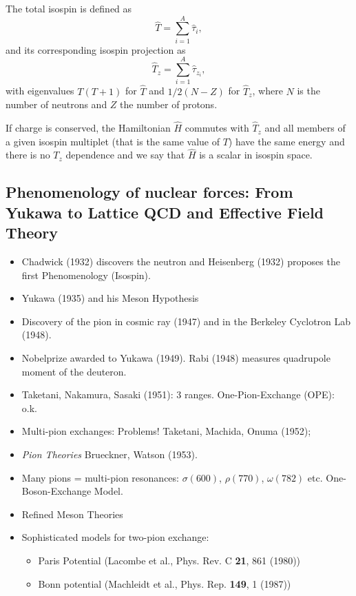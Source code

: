\documentclass[%
oneside,                 %
final,                   %
10pt]{article}
\begin{document}
The total isospin is defined as
\[
\hat{T}=\sum_{i=1}^A\hat{\tau}_i,
\]
and its corresponding isospin projection as
\[
\hat{T}_z=\sum_{i=1}^A\hat{\tau}_{z_i},
\]
with eigenvalues $T(T+1)$ for $\hat{T}$ and $1/2(N-Z)$ for $\hat{T}_z$, where $N$ is the number of neutrons and $Z$ the number of protons. 

If charge is conserved, the Hamiltonian $\hat{H}$ commutes with $\hat{T}_z$ and all members of a given isospin multiplet
(that is the same value of $T$) have the same energy and there is no $T_z$ dependence and we say that $\hat{H}$ is a scalar in isospin space.

\subsection{Phenomenology of nuclear forces: From Yukawa to Lattice QCD and Effective Field Theory}


\begin{itemize}
\item Chadwick (1932) discovers the neutron and Heisenberg (1932) proposes the first Phenomenology (Isospin).  

\item Yukawa (1935) and his Meson Hypothesis       

\item Discovery of the pion in cosmic ray (1947) and in the Berkeley Cyclotron Lab (1948).

\item Nobelprize awarded to Yukawa (1949).  Rabi (1948) measures quadrupole moment of the deuteron.

\item Taketani, Nakamura, Sasaki (1951): 3 ranges.      One-Pion-Exchange (OPE): o.k.

\item Multi-pion exchanges: Problems!   Taketani, Machida, Onuma (1952);

\item \emph{Pion Theories} Brueckner, Watson (1953).

\item Many pions = multi-pion resonances: $\sigma(600)$,  $\rho(770)$,  $\omega(782)$ etc. One-Boson-Exchange Model.

\item Refined Meson Theories

\item Sophisticated models for two-pion exchange:
\begin{itemize}

      \item Paris Potential (Lacombe et al., Phys. Rev. C \textbf{21}, 861 (1980))

      \item Bonn potential (Machleidt et al., Phys. Rep. \textbf{149}, 1 (1987))
\end{itemize}

\noindent
\end{itemize}
\end{document}
